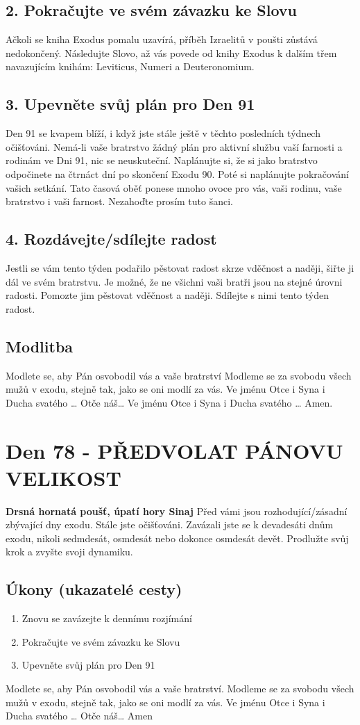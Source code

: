 \documentclass[11pt]{article}
\newcommand{\zacatekDvanactyTyden}{
\textbf{Drsná hornatá poušť, úpatí hory Sinaj} \newline 
Před vámi jsou rozhodující/zásadní zbývající dny exodu. Stále jste očišťováni. Zavázali jste se k devadesáti dnům exodu, nikoli sedmdesát, osmdesát nebo dokonce osmdesát devět. Prodlužte svůj krok a zvyšte svoji dynamiku.

\subsection*{Úkony (ukazatelé cesty)}
\begin{enumerate}
  \item Znovu se zavázejte k dennímu rozjímání
  \item Pokračujte ve svém závazku ke Slovu
  \item Upevněte svůj plán pro Den 91
\end{enumerate}
Modlete se, aby Pán osvobodil vás a vaše bratrství. \newline
Modleme se za svobodu všech mužů v exodu, stejně tak, jako se oni modlí za vás.\newline
Ve jménu Otce i Syna i Ducha svatého …  Otče náš… Amen
}
\begin{document}
\subsection*{2. Pokračujte ve svém závazku ke Slovu}
Ačkoli se kniha Exodus pomalu uzavírá, příběh Izraelitů v poušti zůstává nedokončený. Následujte Slovo, až vás povede od knihy Exodus k dalším třem navazujícím knihám: Leviticus, Numeri a Deuteronomium.
\subsection*{3. Upevněte svůj plán pro Den 91}
Den 91 se kvapem blíží, i když jste stále ještě v těchto posledních týdnech očišťováni. Nemá-li vaše bratrstvo žádný plán pro aktivní službu vaší farnosti a rodinám ve Dni 91, nic se neuskuteční. Naplánujte si, že si jako bratrstvo odpočinete na čtrnáct dní po skončení Exodu 90. Poté si naplánujte pokračování vašich setkání. Tato časová oběť ponese mnoho ovoce pro vás, vaši rodinu, vaše bratrstvo i vaši farnost. Nezahoďte prosím tuto šanci.
\subsection*{4. Rozdávejte/sdílejte radost}
Jestli se vám tento týden podařilo pěstovat radost skrze vděčnost a naději, šiřte ji dál ve svém bratrstvu. Je možné, že ne všichni vaši bratři jsou na stejné úrovni radosti. Pomozte jim pěstovat vděčnost a naději. Sdílejte s nimi tento týden radost.
\subsection*{Modlitba}
Modlete se, aby Pán osvobodil vás a vaše bratrství \newline
Modleme se za svobodu všech mužů v exodu, stejně tak, jako se oni modlí za vás.\newline
Ve jménu Otce i Syna i Ducha svatého … Otče náš… Ve jménu Otce i Syna i Ducha svatého … Amen.
\newpage

\newpage
\section{Den 78 - PŘEDVOLAT PÁNOVU VELIKOST}
\zacatekDvanactyTyden
\end{document}
